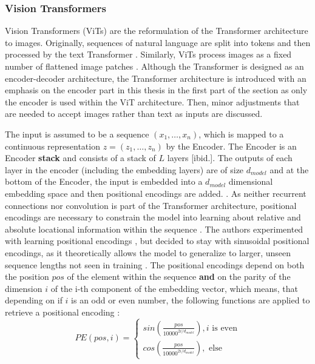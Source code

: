 \subsubsection{Vision Transformers}
\label{section: Vision Transformers}
Vision Transformers (ViTs) are the reformulation of the Transformer architecture \cite{Vaswani2017} to images.
Originally, sequences of natural language are split into tokens and then processed by the text Transformer \citep{Vaswani2017}.  
Similarly, ViTs process images as a fixed number of flattened image patches \citep{Dosovitskiy2020}.
Although the Transformer is designed as an encoder-decoder architecture, the Transformer architecture is introduced with an emphasis on the encoder part in this thesis in the first part of the section as only the encoder is used within the ViT architecture.
Then, minor adjustments that are needed to accept images rather than text as inputs are discussed.
\par
The input is assumed to be a sequence $(x_1,\dots,x_n)$, which is mapped to a continuous representation $z=(z_1,\dots,z_n)$ by the Encoder\citep{Vaswani2017}.
The Encoder is an Encoder \textbf{stack} and consists of a stack of $L$ layers [ibid.].
The outputs of each layer in the encoder (including the embedding layers) are of size $d_{model}$ and at the bottom of the Encoder, the input is embedded into a $d_{model}$ dimensional embedding space and then positional encodings are added. \citep{Vaswani2017}.
As neither recurrent connections nor convolution is part of the Transformer architecture, positional encodings are necessary to constrain the model into learning about relative and absolute locational information within the sequence \citep{Vaswani2017}.
The authors experimented with learning positional encodings \citep{Gehring2018}, but decided to stay with sinusoidal positional encodings, as it theoretically allows the model to generalize to larger, unseen sequence lengths not seen in training \citep{Vaswani2017}.
The positional encodings depend on both the position $pos$ of the element within the sequence \textbf{and} on the parity of the dimension $i$ of the i-th component of the embedding vector, which means, that depending on if $i$ is an odd or even number, the following functions are applied to retrieve a positional encoding \citep{Vaswani2017}:
\begin{equation}
	PE(pos, i) = 
	\begin{cases}
		sin(\frac{pos}{10000^{2i / d_{model}}}), i \text{ is even} \\
		cos(\frac{pos}{10000^{2i / d_{model}}}), \text{ else}
	\end{cases}
	\label{equation:positional-encoding}
\end{equation}
